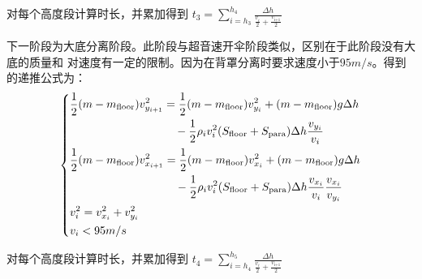 \documentclass[hyperref,a4paper,UTF8]{ctexart}
\begin{document}
对每个高度段计算时长，并累加得到
$
    \displaystyle t_3=\sum_{i=h_3}^{h_4}{\displaystyle\frac{\Delta h}{\frac{\displaystyle v_i}
        {\displaystyle 2}+\frac{\displaystyle v_{\textrm{i+1}} }{\displaystyle 2}}}
$

\medskip
\bigskip
下一阶段为大底分离阶段。此阶段与超音速开伞阶段类似，区别在于此阶段没有大底的质量和
对速度有一定的限制。因为在背罩分离时要求速度小于$95m/s$。得到的递推公式为：
\[
    \begin{dcases}
        \begin{split}
            \frac{1}{2}(m-m_{\text{floor}})v_{y_{i + 1}}^2 &=
            \frac{1}{2}(m-m_{\text{floor}})v_{y_{i}}^2 +
            (m-m_{\text{floor}})g\Delta h \\ &\quad - \frac{1}{2}\rho
            _iv_i^2(S_{\text{floor}}+S_{\text{para}})
            \Delta h\frac{v_{y_i}}{v_i}
        \end{split}
        \\
        \begin{split}
            \frac{1}{2}(m-m_{\text{floor}})v_{x_{i + 1}}^2 &=
            \frac{1}{2}(m-m_{\text{floor}})v_{x_{i}}^2 +
            (m-m_{\text{floor}})g\Delta h \\ &\quad -\frac{1}{2}
            \rho _iv_i^2(S_{\text{floor}}+S_{\text{para}})\Delta h
            \frac{v_{x_i}}{v_i}\frac{v_{x_i}}{v_{y_i}}
        \end{split}
        \\
        v_i^2 = v_{x_i}^2 + v_{y_i}^2 \\
        v_i < 95m/s                   \\
    \end{dcases}
\]

对每个高度段计算时长，并累加得到
$
    \displaystyle t_4=\sum_{i=h_4}^{h_5}{\displaystyle\frac{\Delta h}{\frac{\displaystyle v_i}
        {\displaystyle 2}+\frac{\displaystyle v_{\textrm{i+1}} }{\displaystyle 2}}}
$
\end{document}
